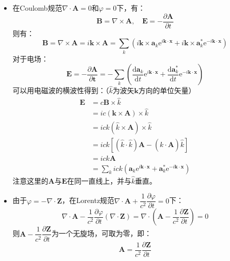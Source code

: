 \documentclass[a4paper,fontset=none]{ctexart}
\begin{document}
\begin{itemize}
        \item[4.(3)]
        在Coulomb规范$\nabla\cdot\bm{A}=0$和$\varphi=0$下，有：
        \[
            \bm{B} = \nabla \times \bm{A},\quad \bm{E} = -\frac{\partial\bm{A}}{\partial t}
        \]
        则有：
        \[
            \bm{B} = \nabla \times \bm{A} = i\bm{k} \times \bm{A} = \sum_k \left(i\bm{k}\times\bm{a}_k\mathrm{e}^{i\bm{k}\cdot\bm{x}} + i\bm{k}\times\bm{a}_k^*\mathrm{e}^{-i\bm{k}\cdot\bm{x}}\right)
        \]
        对于电场：
        \[
            \bm{E} = -\frac{\partial\bm{A}}{\partial\bm{t}} = -\sum_k \left(\frac{\mathrm{d}\bm{a}_k}{\mathrm{d}t}\mathrm{e}^{i\bm{k}\cdot\bm{x}} + \frac{\mathrm{d}\bm{a}_k^*}{\mathrm{d}t}\mathrm{e}^{-i\bm{k}\cdot\bm{x}}\right)
        \]
        可以用电磁波的横波性得到：（$\hat{k}$为波矢$\bm{k}$方向的单位矢量）
        \begin{align*}
            \bm{E}
            &= c\bm{B} \times \hat{k} \\
            &= ic(\bm{k} \times \bm{A}) \times \hat{k} \\
            &= ick(\hat{k} \times \bm{A}) \times \hat{k} \\
            &= ick\left[(\hat{k} \cdot \hat{k})\bm{A} - (\hat{k} \cdot \bm{A})\hat{k}\right] \\
            &= ick\bm{A} \\
            &= \sum_k ick\left(\bm{a}_k\mathrm{e}^{i\bm{k}\cdot\bm{x}} + \bm{a}_k^*\mathrm{e}^{-i\bm{k}\cdot\bm{x}}\right)
        \end{align*}
        注意这里的$\bm{A}$与$\bm{E}$在同一直线上，并与$\hat{k}$垂直。

        \item[5.(1)]
        由于$\varphi=-\nabla\cdot\bm{Z}$，在Lorentz规范$\nabla\cdot\bm{A}+\dfrac{1}{c^2}\dfrac{\partial\varphi}{\partial t}=0$下：
        \[
            \nabla\cdot\bm{A} - \frac{1}{c^2} \frac{\partial\varphi}{\partial t}(\nabla\cdot\bm{Z}) = \nabla \cdot \left(\bm{A} - \frac{1}{c^2}\frac{\partial\bm{Z}}{\partial t}\right) = 0
        \]
        则$\bm{A}-\dfrac{1}{c^2}\dfrac{\partial\bm{Z}}{\partial t}$为一个无旋场，可取为零，即：
        \[
            \bm{A} = \frac{1}{c^2}\frac{\partial\bm{Z}}{\partial t}
        \]


\end{itemize}
\end{document}
